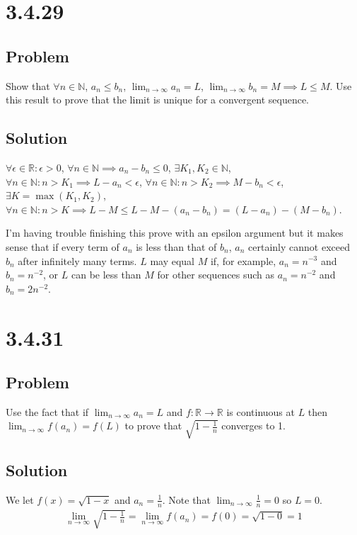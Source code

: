 \documentclass[12pt]{article}
\newcommand{\R}    [0]{\mathbb{R}                   }
\newcommand{\N}    [0]{\mathbb{N}                   }
\begin{document}
\section*{3.4.29}

\subsection*{Problem}
Show that $\forall n \in \N$, $a_n \leq b_n$, $\lim_{n \to \infty} a_n = L$, $\lim_{n \to \infty} b_n = M \implies L \leq M$. Use this result to prove that the limit is unique for a convergent sequence.

\subsection*{Solution}
$\forall \epsilon \in \R : \epsilon > 0$, $\forall n \in \N \implies a_n - b_n \leq 0$, $\exists K_1, K_2 \in \N$, $\forall n \in \N : n > K_1 \implies L - a_n < \epsilon$, $\forall n \in \N : n > K_2 \implies M - b_n < \epsilon$, $\exists K = \max(K_1, K_2)$, $\forall n \in \N : n > K \implies L - M \leq L - M - (a_n - b_n) = (L - a_n) - (M - b_n)$.

I'm having trouble finishing this prove with an epsilon argument but it makes sense that if every term of $a_n$ is less than that of $b_n$, $a_n$ certainly cannot exceed $b_n$ after infinitely many terms. $L$ may equal $M$ if, for example, $a_n = n^{-3}$ and $b_n = n^{-2}$, or $L$ can be less than $M$ for other sequences such as $a_n = n^{-2}$ and $b_n = 2 n^{-2}$.



\section*{3.4.31}

\subsection*{Problem}
Use the fact that if $\lim_{n \to \infty} a_n = L$ and $f : \R \to \R$ is continuous at $L$ then $\lim_{n \to \infty} f(a_n) = f(L)$ to prove that $\sqrt{1 - \frac{1}{n}}$ converges to 1.

\subsection*{Solution}
We let $f(x) = \sqrt{1-x}$ and $a_n = \frac{1}{n}$. Note that $\lim_{n\to\infty} \frac{1}{n} = 0$ so $L = 0$.
\begin{align*}
    \lim_{n\to\infty} \sqrt{1 - \frac{1}{n}} = \lim_{n\to\infty} f(a_n) = f(0) = \sqrt{1 - 0} = 1
\end{align*}
\end{document}
